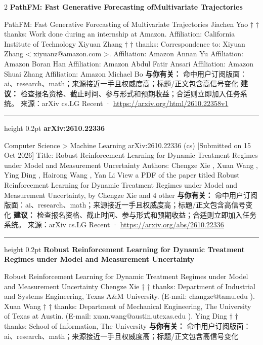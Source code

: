 \documentclass[10.5pt]{ctexart}
\begin{document}
\begin{multicols}{2}
{\large\bfseries PathFM: Fast Generative Forecasting ofMultivariate Trajectories}\par
PathFM: Fast Generative Forecasting of Multivariate Trajectories Jiachen Yao † † thanks: Work done during an internship at Amazon. Affiliation: California Institute of Technology Xiyuan Zhang † † thanks: Correspondence to: Xiyuan Zhang < xiyuanz@amazon.com >. Affiliation: Amazon Annan Yu Affiliation: Amazon Boran Han Affiliation: Amazon Abdul Fatir Ansari Affiliation: Amazon Shuai Zhang Affiliation: Amazon Michael Bo
\textbf{与你有关：} 命中用户订阅版面：ai、research、math；来源接近一手且权威度高；标题/正文包含高信号变化
\textbf{建议：} 检查报名资格、截止时间、参与形式和预期收益；合适则立即加入任务系统。
{\footnotesize\color{ormuted} 来源：arXiv cs.LG Recent · \url{https://arxiv.org/html/2610.22358v1}}
\vspace{2mm}
\hrule height 0.2pt
\vspace{2mm}
{\large\bfseries arXiv:2610.22336}\par
Computer Science > Machine Learning arXiv:2610.22336 (cs) [Submitted on 15 Oct 2026] Title: Robust Reinforcement Learning for Dynamic Treatment Regimes under Model and Measurement Uncertainty Authors: Chengze Xie , Xuan Wang , Ying Ding , Hairong Wang , Yan Li View a PDF of the paper titled Robust Reinforcement Learning for Dynamic Treatment Regimes under Model and Measurement Uncertainty, by Chengze Xie and 4 other 
\textbf{与你有关：} 命中用户订阅版面：ai、research、math；来源接近一手且权威度高；标题/正文包含高信号变化
\textbf{建议：} 检查报名资格、截止时间、参与形式和预期收益；合适则立即加入任务系统。
{\footnotesize\color{ormuted} 来源：arXiv cs.LG Recent · \url{https://arxiv.org/abs/2610.22336}}
\vspace{2mm}
\hrule height 0.2pt
\vspace{2mm}
{\large\bfseries Robust Reinforcement Learning for Dynamic Treatment Regimes under Model and Measurement Uncertainty}\par
Robust Reinforcement Learning for Dynamic Treatment Regimes under Model and Measurement Uncertainty Chengze Xie † † thanks: Department of Industrial and Systems Engineering, Texas A\&M University. (E-mail: changze@tamu.edu ). Xuan Wang † † thanks: Department of Mechanical Engineering, The University of Texas at Austin. (E-mail: xuan.wang@austin.utexas.edu ). Ying Ding † † thanks: School of Information, The University 
\textbf{与你有关：} 命中用户订阅版面：ai、research、math；来源接近一手且权威度高；标题/正文包含高信号变化

\end{multicols}
\end{document}
